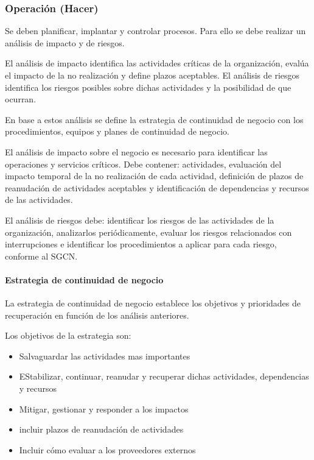     \subsubsection{Operación (Hacer)} %
        Se deben planificar, implantar y controlar procesos. Para ello se debe realizar un análisis de impacto y de riesgos.


        El análisis de impacto identifica las actividades críticas de la organización, evalúa el impacto de la no realización y define plazos aceptables. El análisis de riesgos identifica los riesgos posibles sobre dichas actividades y la posibilidad de que ocurran.

        En base a estos análisis se define la estrategia de continuidad de negocio con los procedimientos, equipos y planes de continuidad de negocio.

        El análisis de impacto sobre el negocio es necesario para identificar las operaciones y servicios críticos. Debe contener: actividades, evaluación del impacto temporal de la no realización de cada actividad, definición de plazos de reanudación de actividades aceptables y identificación de dependencias y recursos de las actividades.

        El análisis de riesgos debe: identificar los riesgos de las actividades de la organización, analizarlos periódicamente, evaluar los riesgos relacionados con interrupciones e identificar los procedimientos a aplicar para cada riesgo, conforme al SGCN.

        \paragraph{Estrategia de continuidad de negocio}
            La estrategia de continuidad de negocio establece los objetivos y prioridades de recuperación en función de los análisis anteriores. 

            Los objetivos de la estrategia son:
            \begin{itemize}
                \item Salvaguardar las actividades mas importantes
                \item EStabilizar, continuar, reanudar y recuperar dichas actividades, dependencias y recursos
                \item Mitigar, gestionar y responder a los impactos
                \item incluir plazos de reanudación de actividades
                \item Incluir cómo evaluar a los proveedores externos
            \end{itemize}

